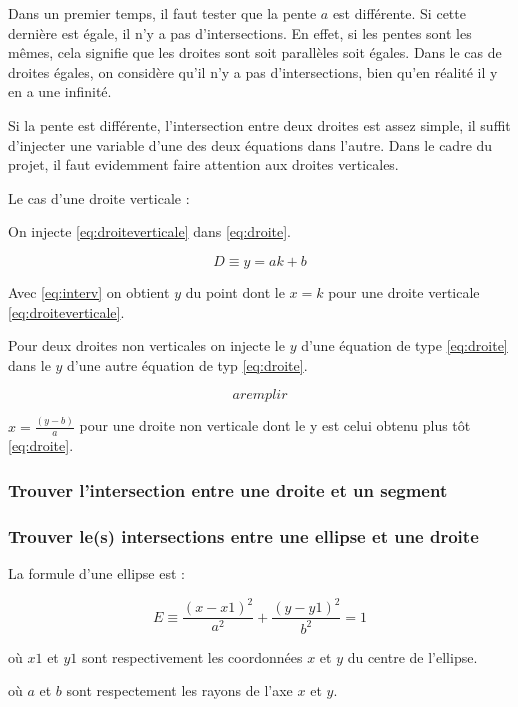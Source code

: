 \documentclass[]{article}
\begin{document}
Dans un premier temps, il faut tester que la pente $a$ est différente. 
Si cette dernière est égale, il n'y a pas d'intersections. En effet,
si les pentes sont les mêmes, cela signifie que les droites sont soit
parallèles soit égales. Dans le cas de droites égales, on considère qu'il
n'y a pas d'intersections, bien qu'en réalité il y en a une infinité.

Si la pente est différente,
l'intersection entre deux droites est assez simple, il suffit 
d'injecter une variable d'une des deux équations dans l'autre.
Dans le cadre du projet, il faut evidemment faire attention aux 
droites verticales.

Le cas d'une droite verticale : 

On injecte \eqref{eq:droiteverticale} dans \eqref{eq:droite}.

\begin{equation} \label{eq:interv}
	D \equiv y = ak + b
\end{equation}

Avec \eqref{eq:interv} on obtient $y$ du point dont le $x = k$
pour une droite verticale \eqref{eq:droiteverticale}.

Pour deux droites non verticales on injecte le $y$ d'une équation
de type \eqref{eq:droite} dans le $y$ d'une autre équation de typ \eqref{eq:droite}.

\begin{equation} \label{eq:internv}
	a remplir
\end{equation}

$ x = \frac {(y - b)}{ a} $ pour une droite non verticale
dont le y est celui obtenu plus tôt \eqref{eq:droite}.

\subsubsection{Trouver l'intersection entre une droite et un segment}

\subsubsection{Trouver le(s) intersections entre une ellipse et une droite}

La formule d'une ellipse est : 

$$ E \equiv \frac{(x - x1)^2}{a^2} + \frac{(y - y1)^2}{b^2} = 1 $$

\begin{description}
\item où $x1$ et $y1$ sont respectivement les coordonnées
$x$ et $y$ du centre de l'ellipse. \\
\item où $a$ et $b$ sont respectement les rayons de l'axe
$x$ et $y$. \\
\end{description}
\end{document}
